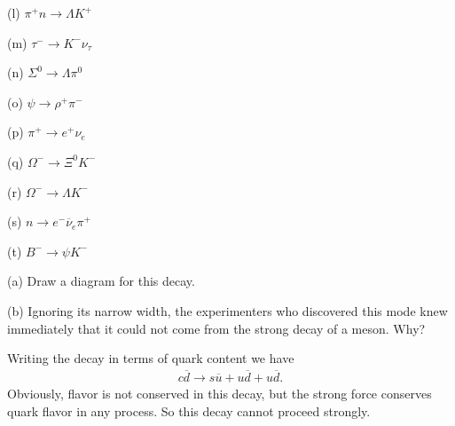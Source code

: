 (l) $\pi^{+}n \rightarrow \Lambda K^{+}$

(m) $\tau^{-} \rightarrow K^{-}\nu_{\tau}$

(n) $\Sigma^{0} \rightarrow \Lambda \pi^{0}$

(o) $\psi \rightarrow \rho^{+}\pi^{-}$

(p) $\pi^{+} \rightarrow e^{+}\nu_{e}$

(q) $\Omega^{-} \rightarrow \Xi^{0}K^{-}$

(r) $\Omega^{-} \rightarrow \Lambda K^{-}$

(s) $n \rightarrow e^{-}\overline{\nu}_{e}\pi^{+}$

(t) $B^{-} \rightarrow \psi K^{-}$



(a) Draw a diagram for this decay.

%    

(b) Ignoring its narrow width, the experimenters who discovered this mode knew immediately that it could not come from the strong decay of a meson.
Why?

Writing the decay in terms of quark content we have
\begin{eqnarray}
    \label{eq:decay-quark}
    c \overline{d} \rightarrow s \overline{u} + u \overline{d} + u \overline{d}
.\end{eqnarray}
Obviously, flavor is not conserved in this decay, but the strong force conserves quark flavor in any process.
So this decay cannot proceed strongly.





